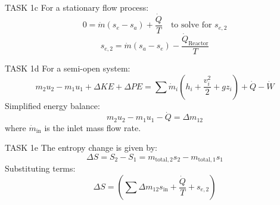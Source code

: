 TASK 1c  
For a stationary flow process:  
\[
0 = \dot{m}(s_e - s_a) + \frac{\dot{Q}}{T} \quad \text{to solve for } s_{e,2}
\]  
\[
s_{e,2} = \dot{m}(s_a - s_e) - \frac{\dot{Q}_{\text{Reactor}}}{T}
\]  

TASK 1d  
For a semi-open system:  
\[
m_2 u_2 - m_1 u_1 + \Delta KE + \Delta PE = \sum \dot{m}_i \left( h_i + \frac{v_i^2}{2} + gz_i \right) + \dot{Q} - \dot{W}
\]  
Simplified energy balance:  
\[
m_2 u_2 - m_1 u_1 - \dot{Q} = \Delta m_{12}
\]  
where \( \dot{m}_{\text{in}} \) is the inlet mass flow rate.

TASK 1e  
The entropy change is given by:  
\[
\Delta S = S_2 - S_1 = m_{\text{total},2} s_2 - m_{\text{total},1} s_1
\]  
Substituting terms:  
\[
\Delta S = \left( \sum \Delta m_{12} s_{\text{in}} + \frac{\dot{Q}}{T} + s_{e,2} \right)
\]